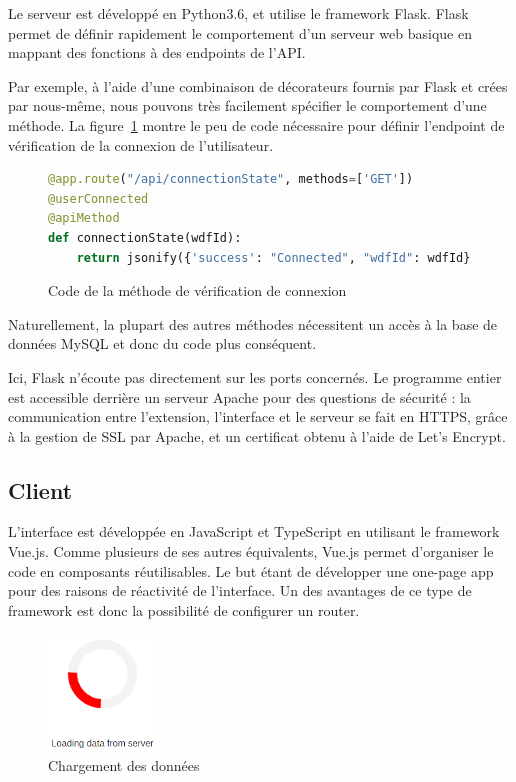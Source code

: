 		Le serveur est développé en Python3.6, et utilise le framework Flask. Flask permet de définir rapidement le comportement d'un serveur web basique en mappant des fonctions à des endpoints de l'API.

		Par exemple, à l'aide d'une combinaison de décorateurs fournis par Flask et crées par nous-même, nous pouvons très facilement spécifier le comportement d'une méthode. La figure~\ref{i-code-server} montre le peu de code nécessaire pour définir l'endpoint de vérification de la connexion de l'utilisateur.

		\begin{figure}[!h]
			\centering
			\begin{lstlisting}[language=python]
@app.route("/api/connectionState", methods=['GET'])
@userConnected
@apiMethod
def connectionState(wdfId):
    return jsonify({'success': "Connected", "wdfId": wdfId})\end{lstlisting}
			\caption{Code de la méthode de vérification de connexion}
			\label{i-code-server}
		\end{figure}

		Naturellement, la plupart des autres méthodes nécessitent un accès à la base de données MySQL et donc du code plus conséquent.

		Ici, Flask n'écoute pas directement sur les ports concernés. Le programme entier est accessible derrière un serveur Apache pour des questions de sécurité : la communication entre l'extension, l'interface et le serveur se fait en HTTPS, grâce à la gestion de SSL par Apache, et un certificat obtenu à l'aide de Let's Encrypt.


	\subsection{Client}

		L'interface est développée en JavaScript et TypeScript en utilisant le framework Vue.js. Comme plusieurs de ses autres équivalents, Vue.js permet d'organiser le code en composants réutilisables. Le but étant de développer une one-page app pour des raisons de réactivité de l'interface. Un des avantages de ce type de framework est donc la possibilité de configurer un router.

		\begin{figure}
			\includegraphics[width=2.9cm]{images/design/loading_spinner}
			\caption{Chargement des données}\label{i-loading}
		\end{figure} 

